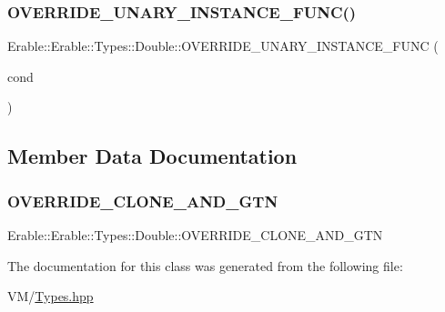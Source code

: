 \subsubsection{\texorpdfstring{OVERRIDE\_UNARY\_INSTANCE\_FUNC()}{OVERRIDE\_UNARY\_INSTANCE\_FUNC()}}
{\footnotesize\ttfamily Erable\+::\+Erable\+::\+Types\+::\+Double\+::\+O\+V\+E\+R\+R\+I\+D\+E\+\_\+\+U\+N\+A\+R\+Y\+\_\+\+I\+N\+S\+T\+A\+N\+C\+E\+\_\+\+F\+U\+NC (\begin{DoxyParamCaption}\item[{cond}]{ }\end{DoxyParamCaption})}



\subsection{Member Data Documentation}
\mbox{\label{class_erable_1_1_erable_1_1_types_1_1_double_ada5e03934cf7643e1e3fdbd592ffecc3}} 
\subsubsection{\texorpdfstring{OVERRIDE\_CLONE\_AND\_GTN}{OVERRIDE\_CLONE\_AND\_GTN}}
{\footnotesize\ttfamily Erable\+::\+Erable\+::\+Types\+::\+Double\+::\+O\+V\+E\+R\+R\+I\+D\+E\+\_\+\+C\+L\+O\+N\+E\+\_\+\+A\+N\+D\+\_\+\+G\+TN}



The documentation for this class was generated from the following file\+:\begin{DoxyCompactItemize}
\item 
V\+M/\mbox{\hyperlink{_types_8hpp}{Types.\+hpp}}\end{DoxyCompactItemize}
